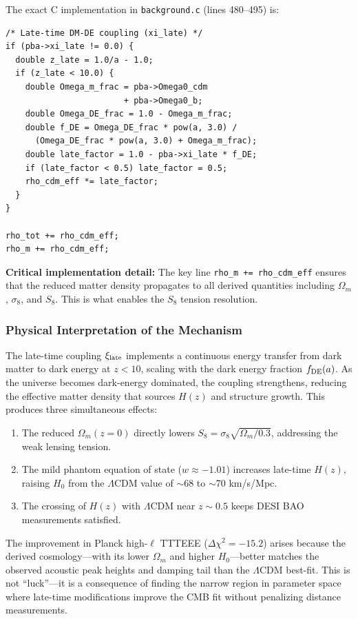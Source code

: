 \documentclass[twocolumn,showpacs,preprintnumbers,amsmath,amssymb,prd]{revtex4-2}
\begin{document}
The exact C implementation in \texttt{background.c} (lines 480--495) is:
\begin{verbatim}
/* Late-time DM-DE coupling (xi_late) */
if (pba->xi_late != 0.0) {
  double z_late = 1.0/a - 1.0;
  if (z_late < 10.0) {
    double Omega_m_frac = pba->Omega0_cdm 
                        + pba->Omega0_b;
    double Omega_DE_frac = 1.0 - Omega_m_frac;
    double f_DE = Omega_DE_frac * pow(a, 3.0) / 
      (Omega_DE_frac * pow(a, 3.0) + Omega_m_frac);
    double late_factor = 1.0 - pba->xi_late * f_DE;
    if (late_factor < 0.5) late_factor = 0.5;
    rho_cdm_eff *= late_factor;
  }
}

rho_tot += rho_cdm_eff;
rho_m += rho_cdm_eff;
\end{verbatim}

\textbf{Critical implementation detail:} The key line \texttt{rho\_m += rho\_cdm\_eff} ensures that the reduced matter density propagates to all derived quantities including $\Omega_m$, $\sigma_8$, and $S_8$. This is what enables the $S_8$ tension resolution.

\subsubsection{Physical Interpretation of the Mechanism}

The late-time coupling $\xi_{\rm late}$ implements a continuous energy transfer from dark matter to dark energy at $z < 10$, scaling with the dark energy fraction $f_{\rm DE}(a)$. As the universe becomes dark-energy dominated, the coupling strengthens, reducing the effective matter density that sources $H(z)$ and structure growth. This produces three simultaneous effects:
\begin{enumerate}
    \item The reduced $\Omega_m(z=0)$ directly lowers $S_8 = \sigma_8\sqrt{\Omega_m/0.3}$, addressing the weak lensing tension.
    \item The mild phantom equation of state ($w \approx -1.01$) increases late-time $H(z)$, raising $H_0$ from the $\Lambda$CDM value of $\sim$68 to $\sim$70 km/s/Mpc.
    \item The crossing of $H(z)$ with $\Lambda$CDM near $z \sim 0.5$ keeps DESI BAO measurements satisfied.
\end{enumerate}

The improvement in Planck high-$\ell$ TTTEEE ($\Delta\chi^2 = -15.2$) arises because the derived cosmology---with its lower $\Omega_m$ and higher $H_0$---better matches the observed acoustic peak heights and damping tail than the $\Lambda$CDM best-fit. This is not ``luck''---it is a consequence of finding the narrow region in parameter space where late-time modifications improve the CMB fit without penalizing distance measurements.
\end{document}
